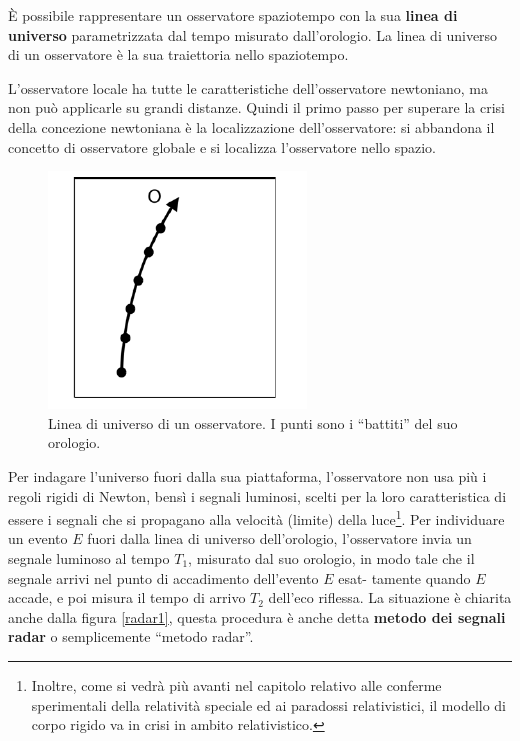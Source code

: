 È possibile rappresentare un osservatore spaziotempo con la sua \textbf{linea di universo} parametrizzata dal tempo misurato dall'orologio.
La linea di universo di un osservatore è la sua traiettoria nello spaziotempo.

L'osservatore locale ha tutte le caratteristiche dell'osservatore newtoniano,
ma non può applicarle su grandi distanze. Quindi il primo passo per superare la crisi della concezione
newtoniana è la localizzazione dell'osservatore: si abbandona il concetto di
osservatore globale e si localizza l'osservatore nello spazio.

\begin{figure}[htbp]
   \centering
   \includegraphics[scale=1]{immagini/minkowski/linea_universo}
   \caption{Linea di universo di un osservatore. I punti sono i ``battiti'' del suo orologio.}
\end{figure}

Per indagare l'universo fuori dalla sua piattaforma, l'osservatore non usa
più i regoli rigidi di Newton, bensì i segnali luminosi, scelti per la loro caratteristica 
di essere i segnali che si propagano alla velocità (limite) della luce\footnote{Inoltre, come si vedrà più avanti
nel capitolo relativo alle conferme sperimentali della relatività speciale ed ai paradossi relativistici, 
il modello di corpo rigido va in crisi in ambito relativistico.}. 
Per individuare un evento $E$ fuori dalla linea di universo dell'orologio, l'osservatore 
invia un segnale luminoso al tempo $T_1$, misurato dal suo orologio, in
modo tale che il segnale arrivi nel punto di accadimento dell'evento $E$ esat-
tamente quando $E$ accade, e poi misura il tempo di arrivo $T_2$ dell'eco riflessa.
La situazione è chiarita anche dalla figura \ref{radar1}, questa procedura è anche detta
\textbf{metodo dei segnali radar} o semplicemente ``metodo radar''.

